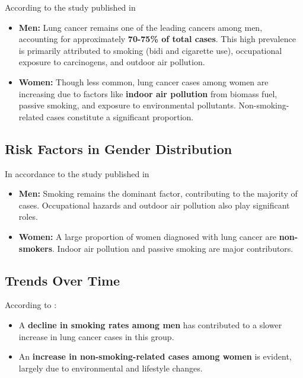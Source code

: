 According to the study published in \cite{meza2015lung}
\begin{itemize}
    \item \textbf{Men:} Lung cancer remains one of the leading cancers among men, accounting for approximately \textbf{70-75\% of total cases}. This high prevalence is primarily attributed to smoking (bidi and cigarette use), occupational exposure to carcinogens, and outdoor air pollution.
    \item \textbf{Women:} Though less common, lung cancer cases among women are increasing due to factors like \textbf{indoor air pollution} from biomass fuel, passive smoking, and exposure to environmental pollutants. Non-smoking-related cases constitute a significant proportion.
\end{itemize}

\subsection{Risk Factors in Gender Distribution}
In accordance to the study published in \cite{huang2022distribution}
\begin{itemize}

    \item \textbf{Men:} Smoking remains the dominant factor, contributing to the majority of cases. Occupational hazards and outdoor air pollution also play significant roles.
    \item \textbf{Women:} A large proportion of women diagnosed with lung cancer are \textbf{non-smokers}. Indoor air pollution and passive smoking are major contributors.
\end{itemize}

\subsection{Trends Over Time}
According to \cite{jemal2001recent}:
\begin{itemize}

    \item A \textbf{decline in smoking rates among men} has contributed to a slower increase in lung cancer cases in this group.
    \item An \textbf{increase in non-smoking-related cases among women} is evident, largely due to environmental and lifestyle changes.
\end{itemize}

